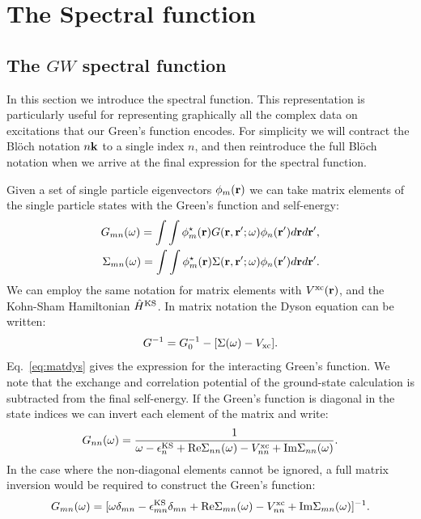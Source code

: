 \section{The Spectral function}
\subsection{The $GW$ spectral function}
\label{sec:spec}
\noindent
In this section we introduce the spectral function. This representation is particularly 
useful for representing graphically
all the complex data on excitations that our Green's function encodes. 
For simplicity we will contract the
Bl\"och notation $n{\bf k}$ to a single index $n$, and then 
reintroduce the full Bl\"och notation when
we arrive at the final expression for the spectral function.

Given a set of single particle eigenvectors $\phi_{m}({\bf r})$ we can take matrix elements of the
single particle states with the Green's function and self-energy:
%
\begin{eqnarray}
G_{mn}(\omega)       = \int \int \phi_{m}^{\star}({\bf r}) G({\bf r},{\bf r}';\omega) \phi_{n}({\bf r}')  d{\bf r} d{\bf r}', \\
\Sigma_{mn}(\omega)  = \int \int \phi_{m}^{\star}({\bf r}) \Sigma({\bf r},{\bf r}';\omega) \phi_{n}({\bf r}') d{\bf r} d{\bf r}'.
\end{eqnarray}
%
We can employ the same notation for matrix elements with $V^{\rm{xc}}({\bf r})$,
and the Kohn-Sham Hamiltonian $\hat{H}^{\rm{KS}}$.
%
In matrix notation the Dyson equation \cite{inkson86} can be written:
%
\begin{equation}
\label{eq:matdys}
G^{-1} = G_{0}^{-1} - [\Sigma(\omega) - V_{\rm{xc}}].
\end{equation}
%
Eq.~\ref{eq:matdys} gives the expression for the interacting Green's function.
We note that the exchange and correlation potential of the ground-state
calculation is subtracted from the final self-energy. If the Green's function is diagonal
in the state indices we can invert each element of the matrix and write:
%
\begin{equation}
G_{nn}(\omega) = \frac{1}{\omega -\epsilon^{\rm{KS}}_{n}+{\rm Re}\Sigma_{nn}(\omega)-V^{\rm{xc}}_{nn}+{\rm Im}\Sigma_{nn}(\omega)}.
\end{equation}
%
In the case where the non-diagonal elements cannot be ignored,
a full matrix inversion would be required to construct the Green's function:
%
\begin{equation}
G_{mn}(\omega) = [\omega \delta_{mn} - \epsilon^{\rm{KS}}_{mn}\delta_{mn} + {\rm Re}\Sigma_{mn}(\omega) - V^{\rm{xc}}_{nn} + {\rm Im}\Sigma_{mn}(\omega)]^{-1}.
\end{equation}

